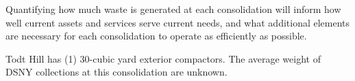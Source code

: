 
    Quantifying how much waste is generated at each consolidation will inform how well current assets and services serve current needs, and what additional elements are necessary for each consolidation to operate as efficiently as possible.
    
    Todt Hill has (1) 30-cubic yard exterior compactors. The average weight of DSNY collections at this consolidation are unknown.
